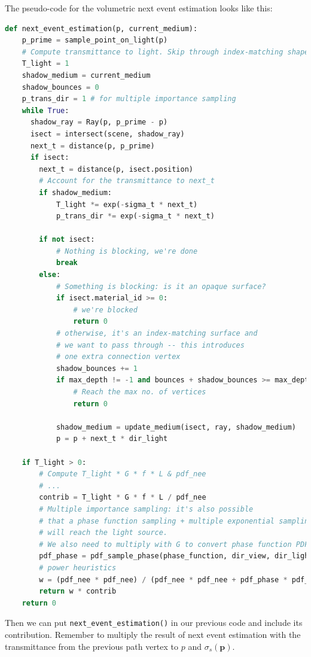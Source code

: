 The pseudo-code for the volumetric next event estimation looks like this:
\begin{lstlisting}[language=python]
def next_event_estimation(p, current_medium):
    p_prime = sample_point_on_light(p)
    # Compute transmittance to light. Skip through index-matching shapes.
    T_light = 1
    shadow_medium = current_medium
    shadow_bounces = 0
    p_trans_dir = 1 # for multiple importance sampling
    while True:
      shadow_ray = Ray(p, p_prime - p)
      isect = intersect(scene, shadow_ray)
      next_t = distance(p, p_prime)
      if isect:
        next_t = distance(p, isect.position)
        # Account for the transmittance to next_t
        if shadow_medium:
            T_light *= exp(-sigma_t * next_t)
            p_trans_dir *= exp(-sigma_t * next_t)

        if not isect:
            # Nothing is blocking, we're done
            break
        else:
            # Something is blocking: is it an opaque surface?
            if isect.material_id >= 0:
                # we're blocked
                return 0
            # otherwise, it's an index-matching surface and
            # we want to pass through -- this introduces
            # one extra connection vertex
            shadow_bounces += 1
            if max_depth != -1 and bounces + shadow_bounces >= max_depth:
                # Reach the max no. of vertices
                return 0

            shadow_medium = update_medium(isect, ray, shadow_medium)
            p = p + next_t * dir_light

    if T_light > 0:
        # Compute T_light * G * f * L & pdf_nee
        # ...
        contrib = T_light * G * f * L / pdf_nee
        # Multiple importance sampling: it's also possible
        # that a phase function sampling + multiple exponential sampling
        # will reach the light source.
        # We also need to multiply with G to convert phase function PDF to area measure.
        pdf_phase = pdf_sample_phase(phase_function, dir_view, dir_light) * G * p_trans_dir
        # power heuristics
        w = (pdf_nee * pdf_nee) / (pdf_nee * pdf_nee + pdf_phase * pdf_phase)
        return w * contrib
    return 0
\end{lstlisting}

Then we can put \lstinline{next_event_estimation()} in our previous code and include its contribution. Remember to multiply the result of next event estimation with the transmittance from the previous path vertex to $p$ and $\sigma_s(\mathbf{p})$.

